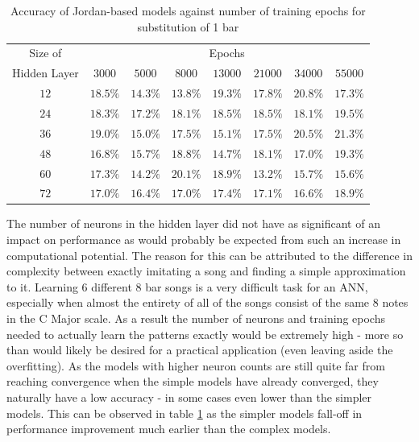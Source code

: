 \documentclass[ author={Stephen Livermore-Tozer},
				supervisor={Dr. Peter Flach},
				degree={MEng},
				title={Algorithmic Co-composition Using Machine Learning},
				subtitle={},
				type={research},
				year={2016} ]{dissertation}
\begin{document}
	\begin{table}[htp]
		\begin{center}
			\begin{tabular}{cccccccc}
				\toprule
				Size of& \multicolumn{7}{c}{Epochs}\\
				\cline{2-8}
				Hidden Layer& $3000$ & $5000$ & $8000$ & $13000$ & $21000$ & $34000$ & $55000$\\
				\hline
				$12$ & $18.5\%$ & $14.3\%$ & $13.8\%$ & $19.3\%$ & $17.8\%$ & $20.8\%$ & $17.3\%$\\
				$24$ & $18.3\%$ & $17.2\%$ & $18.1\%$ & $18.5\%$ & $18.5\%$ & $18.1\%$ & $19.5\%$\\
				$36$ & $19.0\%$ & $15.0\%$ & $17.5\%$ & $15.1\%$ & $17.5\%$ & $20.5\%$ & $21.3\%$\\
				$48$ & $16.8\%$ & $15.7\%$ & $18.8\%$ & $14.7\%$ & $18.1\%$ & $17.0\%$ & $19.3\%$\\
				$60$ & $17.3\%$ & $14.2\%$ & $20.1\%$ & $18.9\%$ & $13.2\%$ & $15.7\%$ & $15.6\%$\\
				$72$ & $17.0\%$ & $16.4\%$ & $17.0\%$ & $17.4\%$ & $17.1\%$ & $16.6\%$ & $18.9\%$\\
				\bottomrule
			\end{tabular}
		\end{center}
		\caption{Accuracy of Jordan-based models against number of training epochs for substitution of 1 bar}
		\label{tab:jordan-1-bar-results}
	\end{table}
	
	The number of neurons in the hidden layer did not have as significant of an impact on performance as would probably be expected from such an increase in computational potential. The reason for this can be attributed to the difference in complexity between exactly imitating a song and finding a simple approximation to it. Learning 6 different 8 bar songs is a very difficult task for an ANN, especially when almost the entirety of all of the songs consist of the same 8 notes in the C Major scale. As a result the number of neurons and training epochs needed to actually learn the patterns exactly would be extremely high - more so than would likely be desired for a practical application (even leaving aside the overfitting). As the models with higher neuron counts are still quite far from reaching convergence when the simple models have already converged, they naturally have a low accuracy - in some cases even lower than the simpler models. This can be observed in table \ref{tab:jordan-1-bar-results} as the simpler models fall-off in performance improvement much earlier than the complex models.
	
\end{document}
